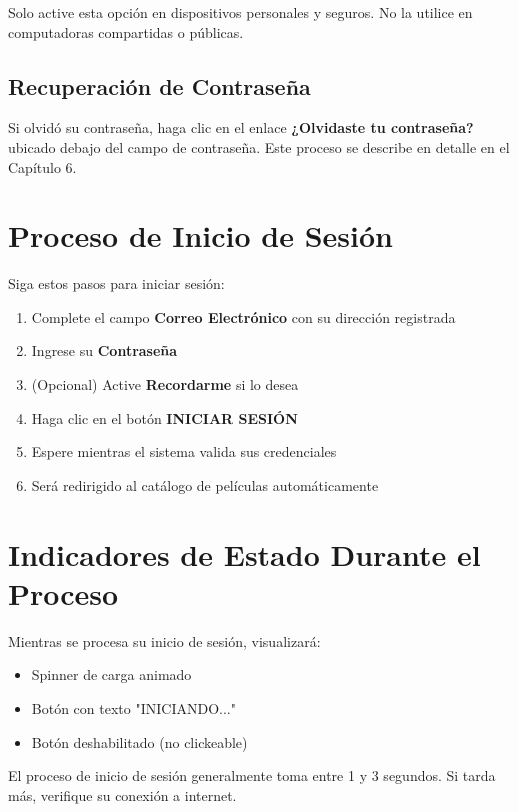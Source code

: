\documentclass[11pt,a4paper,twoside]{book}
\begin{document}
\begin{warningbox}
Solo active esta opción en dispositivos personales y seguros. No la utilice en computadoras compartidas o públicas.
\end{warningbox}

\subsection{Recuperación de Contraseña}

Si olvidó su contraseña, haga clic en el enlace \textbf{¿Olvidaste tu contraseña?} ubicado debajo del campo de contraseña. Este proceso se describe en detalle en el Capítulo 6.

\section{Proceso de Inicio de Sesión}

Siga estos pasos para iniciar sesión:

\begin{enumerate}
    \item Complete el campo \textbf{Correo Electrónico} con su dirección registrada
    \item Ingrese su \textbf{Contraseña}
    \item (Opcional) Active \textbf{Recordarme} si lo desea
    \item Haga clic en el botón \textbf{INICIAR SESIÓN}
    \item Espere mientras el sistema valida sus credenciales
    \item Será redirigido al catálogo de películas automáticamente
\end{enumerate}

\section{Indicadores de Estado Durante el Proceso}

Mientras se procesa su inicio de sesión, visualizará:

\begin{itemize}
    \item Spinner de carga animado
    \item Botón con texto "INICIANDO..."
    \item Botón deshabilitado (no clickeable)
\end{itemize}

\begin{infobox}
El proceso de inicio de sesión generalmente toma entre 1 y 3 segundos. Si tarda más, verifique su conexión a internet.
\end{infobox}
\end{document}

